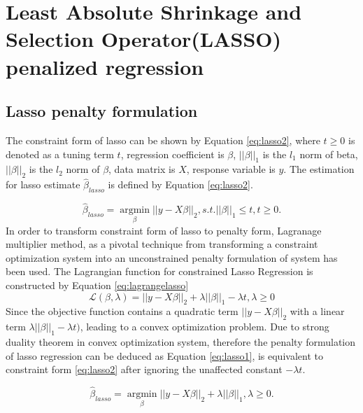 \section{Least Absolute Shrinkage and Selection Operator(LASSO) penalized regression}
\subsection{Lasso penalty formulation}
The constraint form of lasso can be shown by Equation \ref{eq:lasso2}, where $t \geq 0$ is denoted as a tuning term $t$, regression coefficient is $\beta$, $||\beta||_1$ is the $l_1$ norm of beta, $||\beta||_2$ is the $l_2$ norm of $\beta$, data matrix is $X$, response variable is $y$. The estimation for lasso estimate $\hat{\beta}_{lasso}$ is defined by Equation \ref{eq:lasso2}. 

\begin{equation}
	\label{eq:lasso2}
	\hat{\beta}_{lasso} = \underset{\beta}{\operatorname{argmin}} ||y-X\beta||_2, s.t. ||\beta||_1 \leq t, t \geq 0.
\end{equation}
In order to transform constraint form of lasso to penalty form, Lagranage multiplier method, as a pivotal technique from transforming a constraint optimization system into an unconstrained penalty formulation of system has been used. The Lagrangian function for constrained Lasso Regression is constructed by Equation \ref{eq:lagrangelasso}
\begin{equation}
	\label{eq:lagrangelasso}
	\mathcal{L}(\beta,\lambda) =  ||y-X\beta||_2 + \lambda||\beta||_1 - \lambda t, \lambda \geq 0
\end{equation}
 Since the objective function contains a quadratic term $||y-X\beta||_2$ with a linear term $\lambda||\beta||_1 - \lambda t)$, leading to a convex optimization problem. Due to strong duality theorem in convex optimization system, therefore the penalty formulation of lasso regression can be deduced as Equation \ref{eq:lasso1}, is equivalent to constraint form \ref{eq:lasso2} after ignoring the unaffected constant $-\lambda t$.

\begin{equation}
	\label{eq:lasso1}
	\hat{\beta}_{lasso} = \underset{\beta}{\operatorname{argmin}} ||y-X\beta||_2 + \lambda ||\beta||_1, \lambda \geq 0.
\end{equation}

